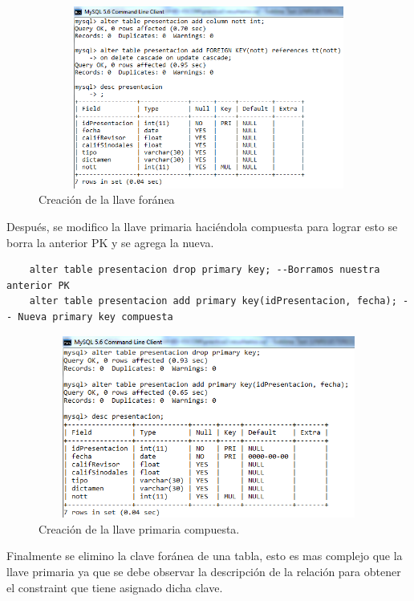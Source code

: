 \documentclass[12pt, titlepage]{article}
\begin{document}
    \begin{figure}[H]
        \begin{center}
            \includegraphics[width=12cm, height=6cm]{img/foranea.png}
            \caption{Creación de la llave foránea}
            \label{fig:foranea}
        \end{center}
    \end{figure}
    Después, se modifico la llave primaria haciéndola compuesta para lograr esto se borra la anterior PK y se agrega la nueva.
    \begin{lstlisting}
    alter table presentacion drop primary key; --Borramos nuestra anterior PK
    alter table presentacion add primary key(idPresentacion, fecha); -- Nueva primary key compuesta
    \end{lstlisting}
    \begin{figure}[H]
        \begin{center}
            \includegraphics[width=12cm, height=6cm]{img/primaria.png}
            \caption{Creación de la llave primaria compuesta.}
            \label{fig:primaria}
        \end{center}
    \end{figure}
    Finalmente se elimino la clave foránea de una tabla, esto es mas complejo que la llave primaria ya que se debe observar la descripción de la relación para obtener el constraint que tiene asignado dicha clave.
\end{document}
